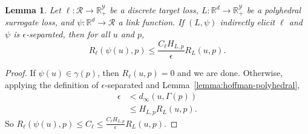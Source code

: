 \documentclass[11pt]{article}
\newcommand{\reals}{\mathbb{R}}
\newcommand{\R}{\mathcal{R}}
\newcommand{\Y}{\mathcal{Y}}
\newtheorem{lemma}{Lemma}
\begin{document}
\begin{lemma}\label{lemma:separated-constant-p}
  Let $\ell: \R \to \reals_+^{\Y}$ be a discrete target loss, $L: \reals^d \to \reals_+^{\Y}$ be a polyhedral surrogate loss, and $\psi: \reals^d \to \R$ a link function.
  If $(L,\psi)$ indirectly elicit $\ell$ and $\psi$ is $\epsilon$-separated, then for all $u$ and $p$,
    \[ R_{\ell}(\psi(u),p) \leq \frac{C_{\ell} H_{L,p}}{\epsilon} R_L(u,p) . \]
\end{lemma}
\begin{proof}
  If $\psi(u) \in \gamma(p)$, then $R_{\ell}(u,p) = 0$ and we are done.
  Otherwise, applying the definition of $\epsilon$-separated and Lemma~\ref{lemma:hoffman-polyhedral},
  \begin{align*}
    \epsilon &<    d_{\infty}(u,\Gamma(p))  \\
             &\leq H_{L,p} R_L(u,p) .
  \end{align*}
  So $R_{\ell}(\psi(u),p) \leq C_{\ell} \leq \frac{C_{\ell} H_{L,p}}{\epsilon} R_L(u,p)$.
\end{proof}
\end{document}
